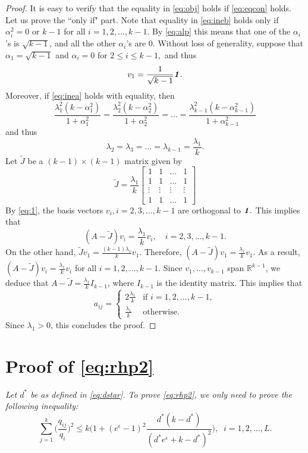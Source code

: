 \documentclass[11pt,onecolumn]{IEEEtran}
\def\mathbi#1{{\textbf{\textit #1}}}
\begin{document}
\begin{proof}
It is easy to verify that the equality in \eqref{eq:obj} holds if \eqref{eq:eqcon} holds. Let us prove the ``only if" part. Note that equality in \eqref{eq:ineb}
holds only if $\alpha_i^2 = 0$ or $k-1$ for all $i=1,2,\dots,k-1$.
By \eqref{eq:alp} this means that one of the $\alpha_i$'s is $\sqrt{k-1}$, and all the other $\alpha_i$'s are $0$.
Without loss of generality, suppose that $\alpha_1=\sqrt{k-1}$ and $\alpha_i=0$ for $2\le i\le k-1,$ and thus
    \begin{equation}\label{eq:1}
v_1=\frac{1}{\sqrt{k-1}} \mathbi{1}.
    \end{equation}
 Moreover, if \eqref{eq:inea} holds with equality, then
$$
\frac{\lambda_1^2 (k-\alpha_1^2)}{1+ \alpha_1^2}
= \frac{\lambda_2^2 (k-\alpha_2^2)}{1+ \alpha_2^2}
= \dots =
\frac{\lambda_{k-1}^2 (k-\alpha_{k-1}^2)}{1+ \alpha_{k-1}^2}
$$
and thus
$$
\lambda_2=\lambda_3=\dots=\lambda_{k-1} = \frac{\lambda_1}{k}.
$$
Let $\tilde J$ be a $(k-1) \times (k-1)$ matrix given by
$$
\tilde J=\frac{\lambda_1}{k}
\left[ \begin{array}{cccc}
1 & 1 & \dots & 1 \\
1 & 1 & \dots & 1 \\
\vdots & \vdots & \vdots & \vdots \\
1 & 1 & \dots & 1 
\end{array} \right]
$$
By \eqref{eq:1}, the basis vectors $v_i, i=2,3,\dots,k-1$ are orthogonal to $\mathbi{1}.$ This implies that 
   $$
   (A-\tilde J)v_i=\frac{\lambda_1}{k} v_i, \quad i=2,3,\dots,k-1.
   $$
On the other hand, $\tilde J v_1=\frac{(k-1)\lambda_1}{k} v_1$. Therefore,
$(A-\tilde J) v_1=\frac{\lambda_1}{k} v_1$.
As a result, $(A-\tilde J)v_i=\frac{\lambda_1}{k} v_i$ for all
$i=1,2,\dots,k-1$. Since $v_1,\dots,v_{k-1}$ span $\mathbb{R}^{k-1}$, we deduce that 
$A-\tilde J=\frac{\lambda_1}{k} I_{k-1}$, where $I_{k-1}$ is the identity matrix.
This implies that
  $$
 a_{ij}=  \begin{cases}
2\frac{\lambda_1}{k} &\text{if } i=1,2,\dots,k-1, \\
\frac{\lambda_1}{k} &\text{otherwise.}
  \end{cases}
  $$
Since $\lambda_1>0$, this concludes the proof.
\end{proof}

\section{Proof of \eqref{eq:rhp2}} \label{app:rhp1}
{\em Let $d^\ast$ be as defined in \eqref{eq:dstar}. To prove \eqref{eq:rhp2}, we only need to prove the following inequality:
  \begin{equation}\label{eq:L}
\sum_{j=1}^{k} \Big( \frac{q_{ij}}{q_i} \Big)^2 
\le k \Big( 1 +   (e^{\epsilon} - 1)^2  
 \frac{d^\ast (k-d^\ast)} {(d^\ast e^{\epsilon} + k - d^\ast)^2}  \Big), \;\; i=1,2,\dots, L.
  \end{equation}
}
\end{document}
